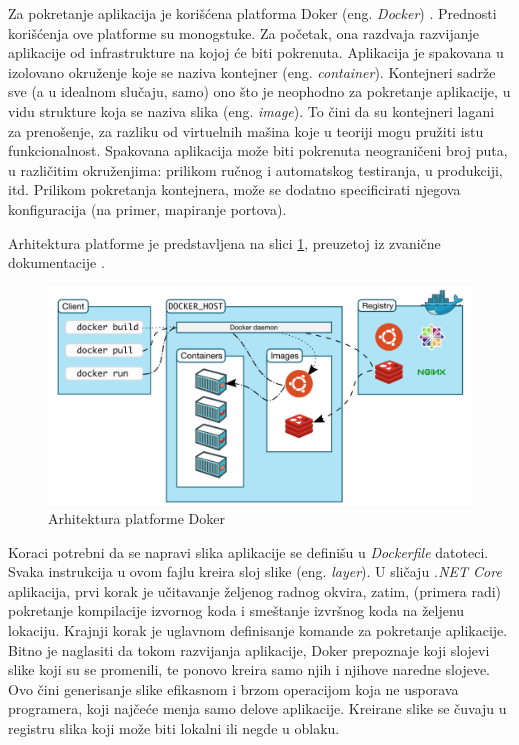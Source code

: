\documentclass[12pt,oneside]{memoir}
\begin{document}
Za pokretanje aplikacija je korišćena platforma Doker (eng. \emph{Docker}) \cite{Docker}. Prednosti korišćenja ove platforme su monogstuke. Za početak, ona razdvaja razvijanje aplikacije od infrastrukture na kojoj će biti pokrenuta. Aplikacija je spakovana u izolovano okruženje koje se naziva kontejner (eng. \emph{container}). Kontejneri sadrže sve (a u idealnom slučaju, samo) ono što je neophodno za pokretanje aplikacije, u vidu strukture koja se naziva slika (eng. \emph{image}). To čini da su kontejneri lagani za prenošenje, za razliku od virtuelnih mašina koje u teoriji mogu pružiti istu funkcionalnost. Spakovana aplikacija može biti pokrenuta neograničeni broj puta, u različitim okruženjima: prilikom ručnog i automatskog testiranja, u produkciji, itd. Prilikom pokretanja kontejnera, može se dodatno specificirati njegova konfiguracija (na primer, mapiranje portova).

Arhitektura platforme je predstavljena na slici \ref{fig:dockerarch}, preuzetoj iz zvanične dokumentacije \cite{DockerArch}. 

\begin{figure}[!ht]
  \centering
  \includegraphics[width=1.0\textwidth]{./images/docker_architecture.png}
  \caption{Arhitektura platforme Doker}
  \label{fig:dockerarch}
\end{figure}

Koraci potrebni da se napravi slika aplikacije se definišu u \emph{Dockerfile} datoteci. Svaka instrukcija u ovom fajlu kreira sloj slike (eng. \emph{layer}). U sličaju \emph{.NET Core} aplikacija, prvi korak je učitavanje željenog radnog okvira, zatim, (primera radi) pokretanje kompilacije izvornog koda i smeštanje izvršnog koda na željenu lokaciju. Krajnji korak je uglavnom definisanje komande za pokretanje aplikacije. Bitno je naglasiti da tokom razvijanja aplikacije, Doker prepoznaje koji slojevi slike koji su se promenili, te ponovo kreira samo njih i njihove naredne slojeve. Ovo čini generisanje slike efikasnom i brzom operacijom koja ne usporava programera, koji najčeće menja samo delove aplikacije. Kreirane slike se čuvaju u registru slika koji može biti lokalni ili negde u oblaku.
\end{document}
